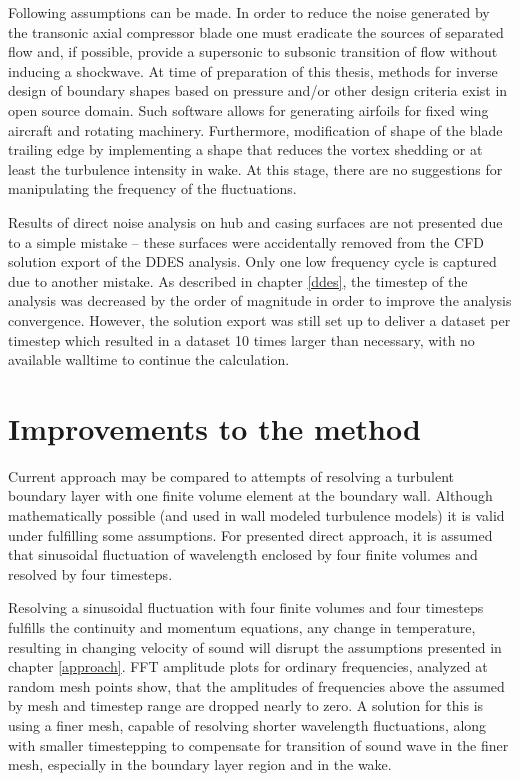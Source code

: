 Following assumptions can be made. In order to reduce the noise generated by the transonic axial compressor blade one must eradicate the sources of separated flow and, if possible, provide a supersonic to subsonic transition of flow without inducing a shockwave. At time of preparation of this thesis, methods for inverse design of boundary shapes based on pressure and/or other design criteria exist in open source domain. Such software allows for generating airfoils for fixed wing aircraft and rotating machinery. Furthermore, modification of shape of the blade trailing edge by implementing a shape that reduces the vortex shedding or at least the turbulence intensity in wake. At this stage, there are no suggestions for manipulating the frequency of the fluctuations.

Results of direct noise analysis on hub and casing surfaces are not presented due to a simple mistake -- these surfaces were  accidentally removed from the CFD solution export of the DDES analysis. Only one low frequency cycle is captured due to another mistake. As described in chapter \ref{ddes}, the timestep of the analysis was decreased by the order of magnitude in order to improve the analysis convergence. However, the solution export was still set up to deliver a dataset per timestep which resulted in a dataset 10 times larger than necessary, with no available walltime to continue the calculation.

\section{Improvements to the method}
Current approach may be compared to attempts of resolving a turbulent boundary layer with one finite volume element at the boundary wall. Although mathematically possible (and used in wall modeled turbulence models) it is valid under fulfilling some assumptions. For presented direct approach, it is assumed that sinusoidal fluctuation of wavelength enclosed by four finite volumes and resolved by four timesteps.

Resolving a sinusoidal fluctuation with four finite volumes and four timesteps fulfills the continuity and momentum equations, any change in temperature, resulting in changing velocity of sound will disrupt the assumptions presented in chapter \ref{approach}. FFT amplitude plots for ordinary frequencies, analyzed at random mesh points show, that the amplitudes of frequencies above the assumed by mesh and timestep range are dropped nearly to zero. A solution for this is using a finer mesh, capable of resolving shorter wavelength fluctuations, along with smaller timestepping to compensate for transition of sound wave in the finer mesh, especially in the boundary layer region and in the wake.

